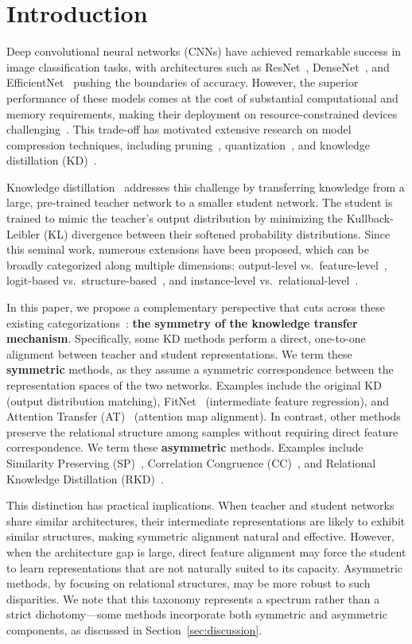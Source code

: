 \documentclass[symmetry,article,submit,pdftex,moreauthors]{Definitions/mdpi}
\begin{document}
\section{Introduction}

Deep convolutional neural networks (CNNs) have achieved remarkable success in image classification tasks, with architectures such as ResNet~\cite{ref1}, DenseNet~\cite{ref2}, and EfficientNet~\cite{ref3} pushing the boundaries of accuracy. However, the superior performance of these models comes at the cost of substantial computational and memory requirements, making their deployment on resource-constrained devices challenging~\cite{ref4}. This trade-off has motivated extensive research on model compression techniques, including pruning~\cite{ref5}, quantization~\cite{ref6}, and knowledge distillation (KD)~\cite{ref7}.

Knowledge distillation~\cite{ref7} addresses this challenge by transferring knowledge from a large, pre-trained teacher network to a smaller student network. The student is trained to mimic the teacher's output distribution by minimizing the Kullback-Leibler (KL) divergence between their softened probability distributions. Since this seminal work, numerous extensions have been proposed, which can be broadly categorized along multiple dimensions: output-level vs.~feature-level~\cite{ref8,ref9}, logit-based vs.~structure-based~\cite{ref10,ref11}, and instance-level vs.~relational-level~\cite{ref12}.

In this paper, we propose a complementary perspective that cuts across these existing categorizations~\cite{ref21}: \textbf{the symmetry of the knowledge transfer mechanism}. Specifically, some KD methods perform a direct, one-to-one alignment between teacher and student representations. We term these \textbf{symmetric} methods, as they assume a symmetric correspondence between the representation spaces of the two networks. Examples include the original KD (output distribution matching), FitNet~\cite{ref8} (intermediate feature regression), and Attention Transfer (AT)~\cite{ref9} (attention map alignment). In contrast, other methods preserve the relational structure among samples without requiring direct feature correspondence. We term these \textbf{asymmetric} methods. Examples include Similarity Preserving (SP)~\cite{ref10}, Correlation Congruence (CC)~\cite{ref11}, and Relational Knowledge Distillation (RKD)~\cite{ref12}.

This distinction has practical implications. When teacher and student networks share similar architectures, their intermediate representations are likely to exhibit similar structures, making symmetric alignment natural and effective. However, when the architecture gap is large, direct feature alignment may force the student to learn representations that are not naturally suited to its capacity. Asymmetric methods, by focusing on relational structures, may be more robust to such disparities. We note that this taxonomy represents a spectrum rather than a strict dichotomy---some methods incorporate both symmetric and asymmetric components, as discussed in Section~\ref{sec:discussion}.
\end{document}
